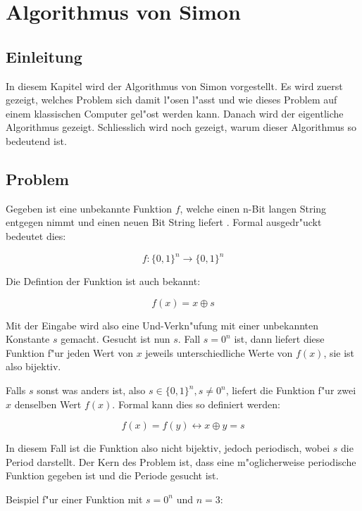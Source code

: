 \chapter{Algorithmus von Simon\label{chapter:simon}} 
\begin{refsection} 

\section{Einleitung} 

In diesem Kapitel wird der Algorithmus von Simon vorgestellt.  Es wird zuerst
gezeigt, welches Problem sich damit l"osen l"asst und wie dieses Problem auf
einem klassischen Computer gel"ost werden kann. Danach wird der eigentliche
Algorithmus gezeigt. Schliesslich wird noch gezeigt, warum dieser Algorithmus so
bedeutend ist.

\section{Problem} 

Gegeben ist eine unbekannte Funktion $f$, welche einen n-Bit langen String
entgegen nimmt und einen neuen Bit String liefert \cite{simon:cse599d-dave-bacon}. Formal ausgedr"uckt bedeutet
dies:

\[
    f\colon\{0,1\}^n\to\{0,1\}^n
\]


Die Defintion der Funktion ist auch bekannt:

\[
    f(x) = x \oplus s
\]

Mit der Eingabe wird also eine Und-Verkn"ufung mit einer unbekannten Konstante
$s$ gemacht.  Gesucht ist nun $s$. Fall $s = 0^n$ ist, dann liefert diese
Funktion f"ur jeden Wert von $x$ jeweils unterschiedliche Werte von $f(x)$, sie
ist also bijektiv.

Falls $s$ sonst was anders ist, also $s \in \{0,1\}^n, s \neq 0^n$, liefert die
Funktion f"ur zwei $x$ denselben Wert $f(x)$. Formal kann dies so definiert
werden:

\[ 
    f(x) = f(y) \leftrightarrow x \oplus y = s 
\]

In diesem Fall ist die Funktion also nicht bijektiv, jedoch periodisch, wobei
$s$ die Period darstellt. Der Kern des Problem ist, dass eine m"oglicherweise
periodische Funktion gegeben ist und die Periode gesucht ist.

Beispiel f"ur einer Funktion mit $s = 0^n$ und $n = 3$:


\end{refsection}
